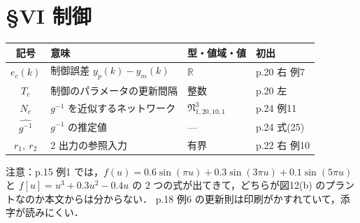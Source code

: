 \documentclass[a4paper,10pt]{ltjsarticle}
\newcommand{\note}[1]{\textcolor{red!70!black}{#1}}
\newenvironment{symtab}{%
  \par\noindent\begin{tabular}{SMTP}
  \toprule
  記号 & 意味 & 型・値域・値 & 初出 \\
  \midrule
}{\bottomrule\end{tabular}\par\medskip}
\begin{document}
\section{§VI 制御}
\begin{symtab}
$e_c(k)$ & 制御誤差 $y_p(k)-y_m(k)$ & $\mathbb{R}$ & p.20 右 例7 \\
$T_c$ & 制御のパラメータの更新間隔 & 整数 & p.20 左 \\
$N_c$ & $g^{-1}$ を近似するネットワーク & $\mathfrak{N}^3_{1,20,10,1}$ & p.24 例11 \\
$\widehat{g^{-1}}$ & $g^{-1}$ の推定値 & --- & p.24 式(25) \\
$r_1,\ r_2$ & 2 出力の参照入力 & 有界 & p.22 右 例10 \\
\end{symtab}

\noindent\note{注意}：p.15 例1 では，$f(u)=0.6\sin(\pi u)+0.3\sin(3\pi u)+0.1\sin(5\pi u)$ と $f[u]=u^3+0.3u^2-0.4u$ の 2 つの式が出てきて，どちらが図12(b) のプラントなのか本文からは分からない．
p.18 例6 の更新則は印刷がかすれていて，添字が読みにくい．
\end{document}
